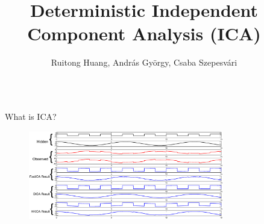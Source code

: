 \documentclass[final]{beamer} %
\title{Deterministic Independent Component Analysis (ICA)}
\author{Ruitong Huang, Andr\'as Gy\"orgy, Csaba Szepesv\'{a}ri}
\begin{document}
\begin{frame}[c]
	\vspace{-1.5cm}

	\begin{columns}[t,totalwidth=\textwidth]
	
	\begin{column}{0.01\textwidth}
	\end{column}

		
 	\begin{column}{.24\textwidth}%
	
		\begin{block}{What is ICA?}
			\begin{figure}
				\includegraphics[width = 0.8\textwidth]{demo}
			\end{figure}
			\vspace{-0.5cm} 					
		\end{block}
		\vspace{0.5ex}


\end{column}
\end{columns}
\end{frame}
\end{document}
